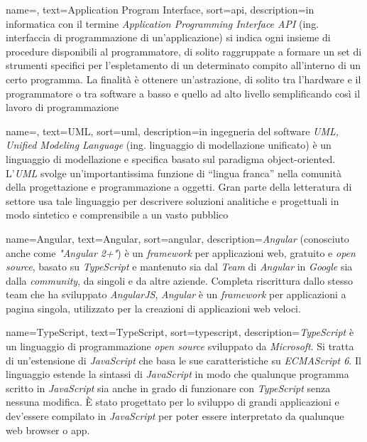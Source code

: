 

 {
    name=,
    text=Application Program Interface,
    sort=api,
    description={in informatica con il termine \emph{Application Programming Interface API} (ing. interfaccia di programmazione di un'applicazione) si indica ogni insieme di procedure disponibili al programmatore, di solito raggruppate a formare un set di strumenti specifici per l'espletamento di un determinato compito all'interno di un certo programma. La finalità è ottenere un'astrazione, di solito tra l'hardware e il programmatore o tra software a basso e quello ad alto livello semplificando così il lavoro di programmazione}
}

 {
    name=,
    text=UML,
    sort=uml,
    description={in ingegneria del software \emph{UML, Unified Modeling Language} (ing. linguaggio di modellazione unificato) è un linguaggio di modellazione e specifica basato sul paradigma object-oriented. L'\emph{UML} svolge un'importantissima funzione di ``lingua franca'' nella comunità della progettazione e programmazione a oggetti. Gran parte della letteratura di settore usa tale linguaggio per descrivere soluzioni analitiche e progettuali in modo sintetico e comprensibile a un vasto pubblico}
}

 {
    name=Angular,
    text=Angular,
    sort=angular,
    description={\emph{Angular} (conosciuto anche come \emph{"Angular 2+"}) è un \emph{framework} per applicazioni web, gratuito e \emph{open source}, basato su \emph{TypeScript} e mantenuto sia dal \emph{Team} di \emph{Angular} in \emph{Google} sia dalla \emph{community}, da singoli e da altre aziende. Completa riscrittura dallo stesso team che ha sviluppato \emph{AngularJS}, \emph{Angular} è un \emph{framework} per applicazioni a pagina singola, utilizzato per la creazioni di applicazioni web veloci.}
}

 {
    name=TypeScript,
    text=TypeScript,
    sort=typescript,
    description={\emph{TypeScript} è un linguaggio di programmazione \emph{open source} sviluppato da \emph{Microsoft}. Si tratta di un'estensione di \emph{JavaScript} che basa le sue caratteristiche su \emph{ECMAScript 6}. Il linguaggio estende la sintassi di \emph{JavaScript} in modo che qualunque programma scritto in \emph{JavaScript} sia anche in grado di funzionare con \emph{TypeScript} senza nessuna modifica. È stato progettato per lo sviluppo di grandi applicazioni e dev'essere compilato in \emph{JavaScript} per poter essere interpretato da qualunque web browser o app.}
}

